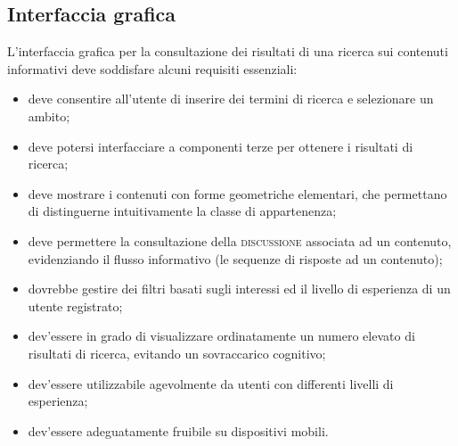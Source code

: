 \subsection{Interfaccia grafica}
\label{sec:tesi:progetto:requisiti:interfaccia-grafica}
L'interfaccia grafica per la consultazione dei risultati di una ricerca sui contenuti informativi deve soddisfare alcuni requisiti essenziali:

\begin{itemize}
	\item deve consentire all'utente di inserire dei termini di ricerca e selezionare un ambito;
	\item deve potersi interfacciare a componenti terze per ottenere i risultati di ricerca;
	\item deve mostrare i contenuti con forme geometriche elementari, che permettano di distinguerne intuitivamente la classe di appartenenza;
	\item deve permettere la consultazione della \textsc{discussione} associata ad un contenuto, evidenziando il flusso informativo (le sequenze di risposte ad un contenuto);
	\item dovrebbe gestire dei filtri basati sugli interessi ed il livello di esperienza di un utente registrato;
	\item dev'essere in grado di visualizzare ordinatamente un numero elevato di risultati di ricerca, evitando un sovraccarico cognitivo;
	\item dev'essere utilizzabile agevolmente da utenti con differenti livelli di esperienza;
	\item dev'essere adeguatamente fruibile su dispositivi mobili.
\end{itemize}

